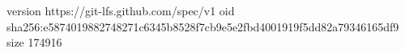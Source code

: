 version https://git-lfs.github.com/spec/v1
oid sha256:e5874019882748271c6345b8528f7cb9e5e2fbd4001919f5dd82a79346165df9
size 174916

